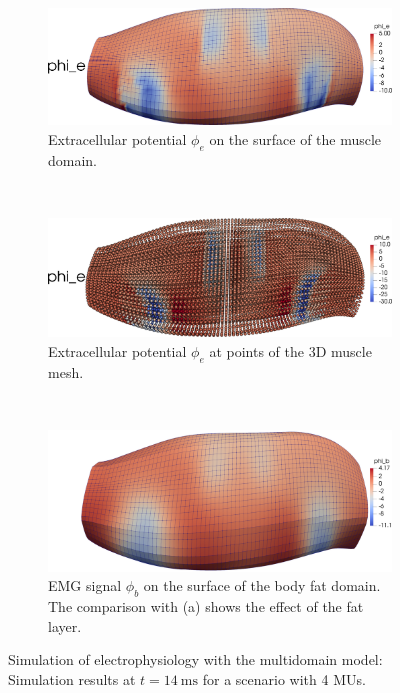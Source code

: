 \begin{figure}
  \centering%
  \begin{subfigure}[t]{\textwidth}%
    \centering%
    \includegraphics[width=\textwidth]{images/results/application/multidomain_4mus_body.png}%
    \caption{Extracellular potential $\phi_e$ on the surface of the muscle domain.}%
    \label{fig:multidomain_4mus_body}%
  \end{subfigure} \\
  \begin{subfigure}[t]{\textwidth}%
    \centering%
    \includegraphics[width=\textwidth]{images/results/application/multidomain_4mus_phi_e_points.png}%
    \caption{Extracellular potential $\phi_e$ at points of the 3D muscle mesh.}%
    \label{fig:multidomain_4mus_phi_e_points}%
  \end{subfigure} \\
  \begin{subfigure}[t]{\textwidth}%
    \centering%
    \includegraphics[width=\textwidth]{images/results/application/multidomain_4mus_emg.png}%
    \caption{EMG signal $\phi_b$ on the surface of the body fat domain. The comparison with (a) shows the effect of the fat layer.}%
    \label{fig:multidomain_4mus_emg}%
  \end{subfigure}
  \caption{Simulation of electrophysiology with the multidomain model: Simulation results at $t=\SI{14}{\ms}$ for a scenario with 4 MUs.}%
  \label{fig:multidomain_4mus_2}%
\end{figure}%



